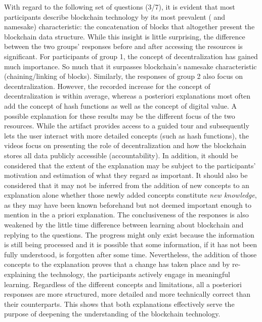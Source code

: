 With regard to the following set of questions (3/7), it is evident that most participants describe blockchain technology by its most prevalent ( and namesake) characteristic: the concatenation of blocks that altogether present the blockchain data structure. While this insight is little surprising, the difference between the two groups' responses before and after accessing the resources is significant. For participants of group 1, the concept of decentralization has gained much importance. So much that it surpasses blockchain's namesake characteristic (chaining/linking of blocks). Similarly, the responses of group 2 also focus on decentralization. However, the recorded increase for the concept of decentralization is within average, whereas a posteriori explanations most often add the concept of hash functions as well as the concept of digital value. A possible explanation for these results may be the different focus of the two resources. While the artifact provides access to a guided tour and subsequently lets the user interact with more detailed concepts (such as hash functions), the videos focus on presenting the role of decentralization and how the blockchain stores all data publicly accessible (accountability). In addition, it should be considered that the extent of the explanation may be subject to the participants' motivation and estimation of what they regard as important. It should also be considered that it may not be inferred from the addition of new concepts to an explanation alone whether those newly added concepts constitute \textit{new knowledge}, as they may have been known beforehand but not deemed important enough to mention in the a priori explanation. The conclusiveness of the responses is also weakened by the little time difference between learning about blockchain and replying to the questions. The progress might only exist because the information is still being processed and it is possible that some information, if it has not been fully understood, is forgotten after some time. Nevertheless, the addition of those concepts to the explanation proves that a change has taken place and by re-explaining the technology, the participants actively engage in meaningful learning. Regardless of the different concepts and limitations, all a posteriori responses are more structured, more detailed and more technically correct than their counterparts. This shows that both explanations effectively serve the purpose of deepening the understanding of the blockchain technology. 

